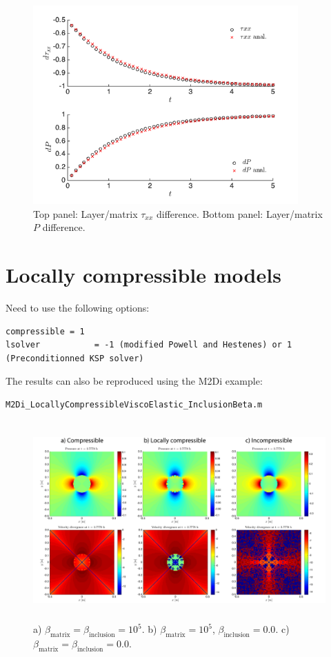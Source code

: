 \documentclass[12pt,english,openany]{scrbook}
\begin{document}
\begin{figure}[ht!]
\centerline{\includegraphics[height=3.0in]{./Figures/VangelisTest_MDOODZ}}
\caption{Top panel: Layer/matrix $\tau_{xx}$ difference. Bottom panel: Layer/matrix $P$ difference.}
\label{Vangelis}
\end{figure}

\section{Locally compressible models}

Need to use the following options:
\begin{verbatim} 
compressible = 1
lsolver           = -1 (modified Powell and Hestenes) or 1 (Preconditionned KSP solver)
\end{verbatim}

The results can also be reproduced using the M2Di example:
\begin{verbatim} 
M2Di_LocallyCompressibleViscoElastic_InclusionBeta.m
\end{verbatim}

\begin{figure}[ht!]
\centerline{\includegraphics[height=3.0in]{./Figures/LocallyCompressible_MDOODZ}}
\caption{a) $\beta_{\text{matrix}} = \beta_{\text{inclusion}} = 10^{5} $. b) $\beta_{\text{matrix}} = 10^{5} $, $\beta_{\text{inclusion}} = 0.0$. c) $\beta_{\text{matrix}} = \beta_{\text{inclusion}} = 0.0 $.}
\label{LocComp}
\end{figure}
\end{document}
